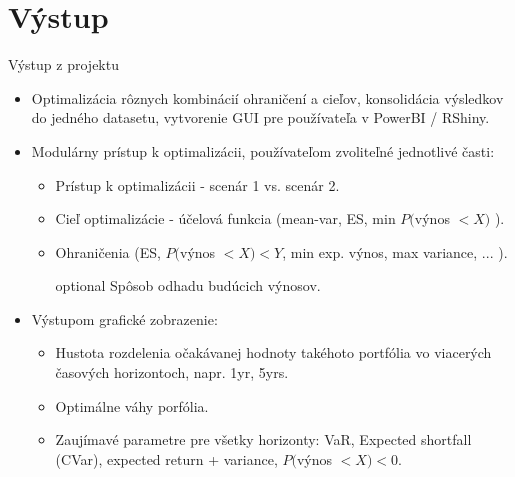\documentclass{Bredelebeamer}
\begin{document}
\section{Výstup}
\begin{frame}{Výstup z projektu}
	\begin{itemize}
		\item Optimalizácia rôznych kombinácií ohraničení a cieľov, konsolidácia výsledkov do jedného datasetu, vytvorenie GUI pre používateľa v PowerBI / RShiny.
		\item Modulárny prístup k optimalizácii, používateľom zvoliteľné jednotlivé časti:
		\begin{itemize}
			\item Prístup k optimalizácii - scenár 1 vs. scenár 2.
			\item Cieľ optimalizácie - účelová funkcia (mean-var, ES, min $P($výnos $<X)$ ).
			\item Ohraničenia (ES, $P($výnos $<X) < Y$, min exp. výnos, max variance, ... ).
			\item [optional] Spôsob odhadu budúcich výnosov.
		\end{itemize}
		\pause\item Výstupom grafické zobrazenie:
		\begin{itemize}
			\item Hustota rozdelenia očakávanej hodnoty takéhoto portfólia vo viacerých časových horizontoch, napr. 1yr, 5yrs.
			\item Optimálne váhy porfólia.			
			\item Zaujímavé parametre pre všetky horizonty: VaR, Expected shortfall (CVar), expected return + variance, $P($výnos $<X) < 0$.
		\end{itemize}
	\end{itemize}	
\end{frame}
\end{document}
